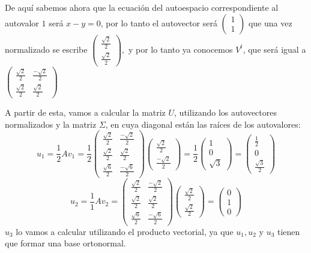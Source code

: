 De aquí sabemos ahora que la ecuación del autoespacio correspondiente al autovalor $1$ será $x-y=0$, por lo tanto el autovector será $\begin{pmatrix}
		1 \\
		1
	\end{pmatrix}$
que una vez normalizado se escribe $\begin{pmatrix}
		\frac{\sqrt2}{2} \\
		\frac{\sqrt2}{2}
	\end{pmatrix},$
y por lo tanto ya conocemos $V^t$, que será igual a $\begin{pmatrix}
		\frac{\sqrt2}{2} & \frac{-\sqrt2}{2} \\
		\frac{\sqrt2}{2} & \frac{\sqrt2}{2}
	\end{pmatrix}$

A partir de esta, vamos a calcular la matriz $U$, utilizando los autovectores normalizados y la matriz $\Sigma$, en cuya diagonal están las raíces de los autovalores:
\[
	u_1=\frac{1}{2}Av_1=\frac{1}{2}\begin{pmatrix}
		\frac{\sqrt2}{2} & \frac{-\sqrt2}{2} \\
		\frac{\sqrt2}{2} & \frac{\sqrt2}{2}  \\
		\frac{\sqrt6}{2} & \frac{-\sqrt6}{2}
	\end{pmatrix}
	\begin{pmatrix}
		\frac{\sqrt2}{2} \\
		\frac{-\sqrt2}{2}
	\end{pmatrix}
	=\frac{1}{2}
	\begin{pmatrix}
		1 \\
		0 \\
		\sqrt3
	\end{pmatrix}
	=
	\begin{pmatrix}
		\frac{1}{2} \\
		0           \\
		\frac{\sqrt3}{2}
	\end{pmatrix}
\]
\[
	u_2=\frac{1}{1}Av_2=\begin{pmatrix}
		\frac{\sqrt2}{2} & \frac{-\sqrt2}{2} \\
		\frac{\sqrt2}{2} & \frac{\sqrt2}{2}  \\
		\frac{\sqrt6}{2} & \frac{-\sqrt6}{2}
	\end{pmatrix}
	\begin{pmatrix}
		\frac{\sqrt2}{2} \\
		\frac{\sqrt2}{2}
	\end{pmatrix}
	=
	\begin{pmatrix}
		0 \\
		1 \\
		0
	\end{pmatrix}
\]
$u_3$ lo vamos a calcular utilizando el producto vectorial, ya que $u_1, u_2$ y $u_3$ tienen que formar una base ortonormal.

